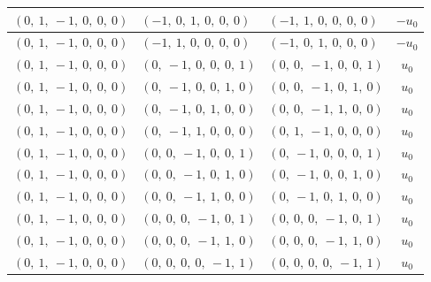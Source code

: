 \documentclass[11pt]{article}
\theoremstyle{definition}
\begin{document}
\begin{longtable}{|l|l|l|c|}
    \hline
    $\left( 0, \  1, \  -1, \  0, \  0, \  0\right)$ & $\left( -1, \  0, \  1, \  0, \  0, \  0\right)$ & $\left( -1, \  1, \  0, \  0, \  0, \  0\right)$ & $- u_{0}$ \\
    \hline
    $\left( 0, \  1, \  -1, \  0, \  0, \  0\right)$ & $\left( -1, \  1, \  0, \  0, \  0, \  0\right)$ & $\left( -1, \  0, \  1, \  0, \  0, \  0\right)$ & $- u_{0}$ \\
    \hline
    $\left( 0, \  1, \  -1, \  0, \  0, \  0\right)$ & $\left( 0, \  -1, \  0, \  0, \  0, \  1\right)$ & $\left( 0, \  0, \  -1, \  0, \  0, \  1\right)$ & $u_{0}$ \\
    \hline
    $\left( 0, \  1, \  -1, \  0, \  0, \  0\right)$ & $\left( 0, \  -1, \  0, \  0, \  1, \  0\right)$ & $\left( 0, \  0, \  -1, \  0, \  1, \  0\right)$ & $u_{0}$ \\
    \hline
    $\left( 0, \  1, \  -1, \  0, \  0, \  0\right)$ & $\left( 0, \  -1, \  0, \  1, \  0, \  0\right)$ & $\left( 0, \  0, \  -1, \  1, \  0, \  0\right)$ & $u_{0}$ \\
    \hline
    $\left( 0, \  1, \  -1, \  0, \  0, \  0\right)$ & $\left( 0, \  -1, \  1, \  0, \  0, \  0\right)$ & $\left( 0, \  1, \  -1, \  0, \  0, \  0\right)$ & $u_{0}$ \\
    \hline
    $\left( 0, \  1, \  -1, \  0, \  0, \  0\right)$ & $\left( 0, \  0, \  -1, \  0, \  0, \  1\right)$ & $\left( 0, \  -1, \  0, \  0, \  0, \  1\right)$ & $u_{0}$ \\
    \hline
    $\left( 0, \  1, \  -1, \  0, \  0, \  0\right)$ & $\left( 0, \  0, \  -1, \  0, \  1, \  0\right)$ & $\left( 0, \  -1, \  0, \  0, \  1, \  0\right)$ & $u_{0}$ \\
    \hline
    $\left( 0, \  1, \  -1, \  0, \  0, \  0\right)$ & $\left( 0, \  0, \  -1, \  1, \  0, \  0\right)$ & $\left( 0, \  -1, \  0, \  1, \  0, \  0\right)$ & $u_{0}$ \\
    \hline
    $\left( 0, \  1, \  -1, \  0, \  0, \  0\right)$ & $\left( 0, \  0, \  0, \  -1, \  0, \  1\right)$ & $\left( 0, \  0, \  0, \  -1, \  0, \  1\right)$ & $u_{0}$ \\
    \hline
    $\left( 0, \  1, \  -1, \  0, \  0, \  0\right)$ & $\left( 0, \  0, \  0, \  -1, \  1, \  0\right)$ & $\left( 0, \  0, \  0, \  -1, \  1, \  0\right)$ & $u_{0}$ \\
    \hline
    $\left( 0, \  1, \  -1, \  0, \  0, \  0\right)$ & $\left( 0, \  0, \  0, \  0, \  -1, \  1\right)$ & $\left( 0, \  0, \  0, \  0, \  -1, \  1\right)$ & $u_{0}$ \\

\end{longtable}
\end{document}
